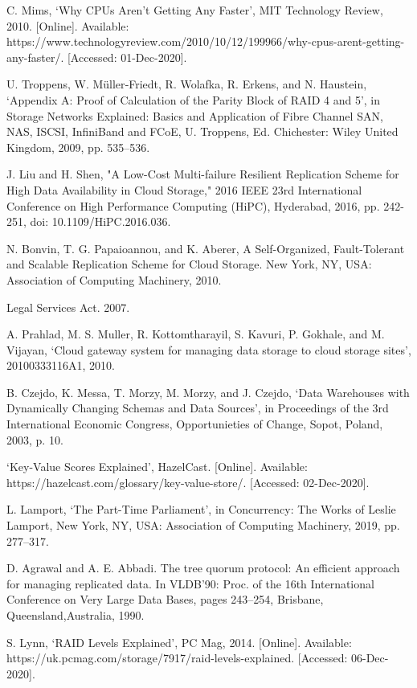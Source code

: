 \documentclass{UoYCSproject}
\begin{document}
\begin{thebibliography}{100}
C. Mims, ‘Why CPUs Aren’t Getting Any Faster’, MIT Technology Review, 2010. [Online]. Available: https://www.technologyreview.com/2010/10/12/199966/why-cpus-arent-getting-any-faster/. [Accessed: 01-Dec-2020].

U. Troppens, W. Müller‐Friedt, R. Wolafka, R. Erkens, and N. Haustein, ‘Appendix A: Proof of Calculation of the Parity Block of RAID 4 and 5’, in Storage Networks Explained: Basics and Application of Fibre Channel SAN, NAS, ISCSI, InfiniBand and FCoE, U. Troppens, Ed. Chichester: Wiley United Kingdom, 2009, pp. 535–536.

J. Liu and H. Shen, "A Low-Cost Multi-failure Resilient Replication Scheme for High Data Availability in Cloud Storage," 2016 IEEE 23rd International Conference on High Performance Computing (HiPC), Hyderabad, 2016, pp. 242-251, doi: 10.1109/HiPC.2016.036.

N. Bonvin, T. G. Papaioannou, and K. Aberer, A Self-Organized, Fault-Tolerant and Scalable Replication Scheme for Cloud Storage. New York, NY, USA: Association of Computing Machinery, 2010.

Legal Services Act. 2007.

A. Prahlad, M. S. Muller, R. Kottomtharayil, S. Kavuri, P. Gokhale, and M. Vijayan, ‘Cloud gateway system for managing data storage to cloud storage sites’, 20100333116A1, 2010.

B. Czejdo, K. Messa, T. Morzy, M. Morzy, and J. Czejdo, ‘Data Warehouses with Dynamically Changing Schemas and Data Sources’, in Proceedings of the 3rd International Economic Congress, Opportunieties of Change, Sopot, Poland, 2003, p. 10.

‘Key-Value Scores Explained’, HazelCast. [Online]. Available: https://hazelcast.com/glossary/key-value-store/. [Accessed: 02-Dec-2020].

L. Lamport, ‘The Part-Time Parliament’, in Concurrency: The Works of Leslie Lamport, New York, NY, USA: Association of Computing Machinery, 2019, pp. 277–317.

D. Agrawal and A. E. Abbadi. The tree quorum protocol: An efficient approach for managing replicated data. In VLDB’90: Proc. of the 16th International Conference on Very Large Data Bases, pages 243–254, Brisbane, Queensland,Australia, 1990.

S. Lynn, ‘RAID Levels Explained’, PC Mag, 2014. [Online]. Available: https://uk.pcmag.com/storage/7917/raid-levels-explained. [Accessed: 06-Dec-2020].


\end{thebibliography}
\end{document}
